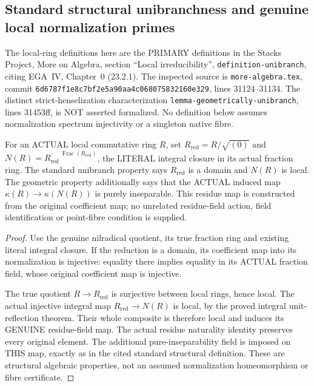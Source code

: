 \subsection{Standard structural unibranchness and genuine local normalization primes}
\label{subsec:unibranch-local-normalizations}

The local-ring definitions here are the PRIMARY definitions in the
Stacks Project, More on Algebra, section ``Local irreducibility'',
\texttt{definition-unibranch}, citing EGA~IV, Chapter~0 (23.2.1).
The inspected source is \texttt{more-algebra.tex}, commit
\texttt{6d6787f1e8c7bf2e5a90aa4c068075832160e329},
lines 31124--31134. The distinct strict-henselization characterization
\texttt{lemma-geometrically-unibranch}, lines 31453ff, is NOT
asserted formalized. No definition below assumes normalization
spectrum injectivity or a singleton native fibre.

\begin{definition}
\label{algebra:actual-structural-unibranch-local-ring}
For an ACTUAL local commutative ring $R$, set
$R_{\mathrm{red}}=R/\sqrt{(0)}$ and
$N(R)=\overline{R_{\mathrm{red}}}^{\,\operatorname{Frac}(R_{\mathrm{red}})}$,
the LITERAL integral closure in its actual fraction ring.
The standard unibranch property says $R_{\mathrm{red}}$ is a
domain and $N(R)$ is local. The geometric property additionally
says that the ACTUAL induced map $\kappa(R)\to\kappa(N(R))$
is purely inseparable. This residue map is constructed from the
original coefficient map; no unrelated residue-field action,
field identification or point-fibre condition is supplied.
\leanok
\end{definition}
\begin{proof}
Use the genuine nilradical quotient, its true fraction ring and
existing literal integral closure. If the reduction is a domain,
its coefficient map into its normalization is injective: equality
there implies equality in its ACTUAL fraction field, whose
original coefficient map is injective.

The true quotient $R\to R_{\mathrm{red}}$ is surjective between
local rings, hence local. The actual injective integral map
$R_{\mathrm{red}}\to N(R)$ is local, by the proved integral
unit-reflection theorem. Their whole composite is therefore
local and induces its GENUINE residue-field map. The actual
residue naturality identity preserves every original element.
The additional pure-inseparability field is imposed on THIS
map, exactly as in the cited standard structural definition.
These are structural algebraic properties, not an assumed
normalization homeomorphism or fibre certificate.
\end{proof}


